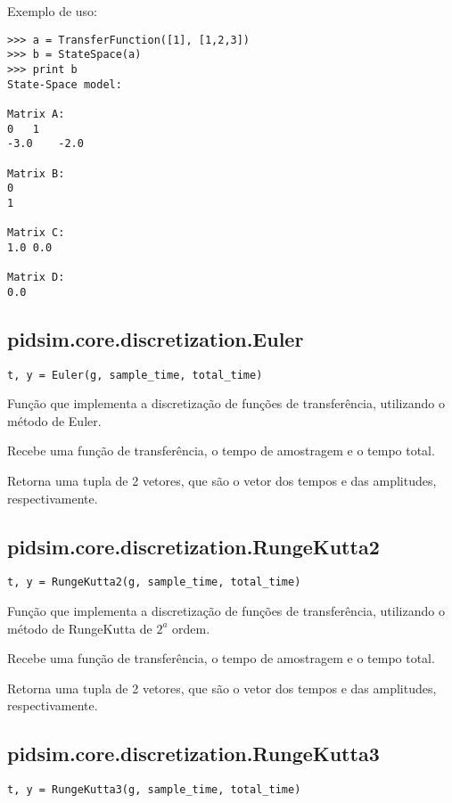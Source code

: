    Exemplo de uso:
    
    \begin{verbatim}
>>> a = TransferFunction([1], [1,2,3])
>>> b = StateSpace(a)
>>> print b
State-Space model:

Matrix A:
0   1   
-3.0    -2.0    

Matrix B:
0   
1   

Matrix C:
1.0 0.0 

Matrix D:
0.0 
    \end{verbatim}

\subsection{pidsim.core.discretization.Euler}

    \begin{verbatim}
t, y = Euler(g, sample_time, total_time)
    \end{verbatim}

    Função que implementa a discretização de funções de transferência,
    utilizando o método de Euler.
    
    Recebe uma função de transferência, o tempo de amostragem e o tempo
    total.

    Retorna uma tupla de 2 vetores, que são o vetor dos tempos e das amplitudes,
    respectivamente.

\subsection{pidsim.core.discretization.RungeKutta2}

    \begin{verbatim}
t, y = RungeKutta2(g, sample_time, total_time)
    \end{verbatim}
    
    Função que implementa a discretização de funções de transferência,
    utilizando o método de RungeKutta de $2^a$ ordem.
    
    Recebe uma função de transferência, o tempo de amostragem e o tempo
    total.
    
    Retorna uma tupla de 2 vetores, que são o vetor dos tempos e das amplitudes,
    respectivamente.

\subsection{pidsim.core.discretization.RungeKutta3}

    \begin{verbatim}
t, y = RungeKutta3(g, sample_time, total_time)
    \end{verbatim}
    
